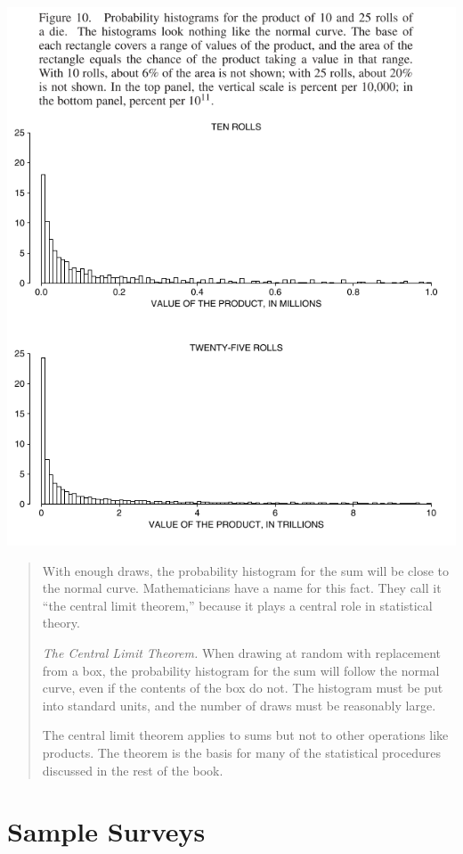 \documentclass[
]{book}
\begin{document}
\includegraphics{images/Ch18Img08.png}

\begin{quote}
With enough draws, the probability histogram for the sum will be close to the normal curve. Mathematicians have a name for this fact. They call it ``the central limit theorem,'' because it plays a central role in statistical theory.

\emph{The Central Limit Theorem.} When drawing at random with replacement from a box, the probability histogram for the sum will follow the normal curve, even if the contents of the box do not. The histogram must be put into standard units, and the number of draws must be reasonably large.

The central limit theorem applies to sums but not to other operations like products. The theorem is the basis for many of the statistical procedures discussed in the rest of the book.
\end{quote}

\hypertarget{sample_surveys}{%
\chapter{Sample Surveys}\label{sample_surveys}}
\end{document}

